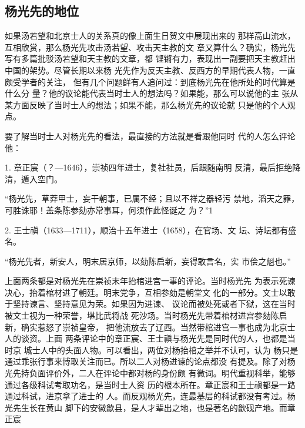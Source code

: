 \subsection{杨光先的地位}
\par
如果汤若望和北京士人的关系真的像上面生日贺文中展现出来的%
那样高山流水，互相欣赏，那么杨光先攻击汤若望、攻击天主教的文%
章又算什么？确实，杨光先写有多篇批驳汤若望和天主教的文章，都%
铿锵有力，表现出一副要把天主教赶出中国的架势。尽管长期以来杨%
光先作为反天主教、反西方的早期代表人物，一直颇受学者的关注，%
但有几个问题鲜有人追问过：到底杨光先在他所处的时代算是什么分%
量？他的议论能代表当时士人的想法吗？如果能，那么可以说他的主%
张从某方面反映了当时士人的想法；如果不能，那么杨光先的议论就%
只是他的个人观点。%
\par
要了解当时士人对杨光先的看法，最直接的方法就是看跟他同时%
代的人怎么评论他：%
\par
1. 章正宸（？—1646），崇祯四年进士，复社社员，后跟随南明%
反清，最后拒绝降清，遁入空门。%
\par
{\bookkai “杨光先，草莽甲士，妄干朝事，已属不经；且以不祥之器轻污}%
{\bookkai 禁地，滔天之罪，可胜诛耶！盖条陈参劾亦常事耳，何须作此怪诞之}%
{\bookkai 为？”1}%
\par
2. 王士禛（1633—1711），顺治十五年进士（1658），在官场、文%
坛、诗坛都有盛名。%
\par
{\bookkai “杨光先者，新安人，明末居京师，以劾陈启新，妄得敢言名，实}%
{\bookkai 市侩之魁也。”}%
\par
上面两条都是对杨光先在崇祯末年抬棺进宫一事的评论。当时杨光先%
为表示死谏决心，抬着棺材进了朝廷。明末党争，互相参劾是朝堂文%
化的一部分。文士以敢于坚持谏言、坚持意见为荣。如果因为进谏、%
议论而被处死或者下狱，这在当时被文士视为一种荣誉，堪比武将战%
死沙场。当时杨光先带着棺材进宫参劾陈启新，确实惹怒了崇祯皇帝，%
把他流放去了辽西。当然带棺进宫一事也成为北京士人的谈资。上面%
两条评论中的章正宸、王士禛与杨光先是同时代的人，也都是当时京%
城士人中的头面人物。可以看出，两位对杨抬棺之举并不认可，认为%
杨只是通过乖张行事来博取关注而已。所以二人对杨进谏的论点都没%
有提及。除了对杨光先持负面评价外，二人在评论中都对杨的身份颇%
有微词。明代重视科举，能够通过各级科试考取功名，是当时士人资%
历的根本所在。章正宸和王士禛都是一路通过科试，进京拿了进士的%
人。而反观杨光先，连最基层的科试都没有考过。杨光先生长在黄山%
脚下的安徽歙县，是人才辈出之地，也是著名的歙砚产地。而章正宸%
